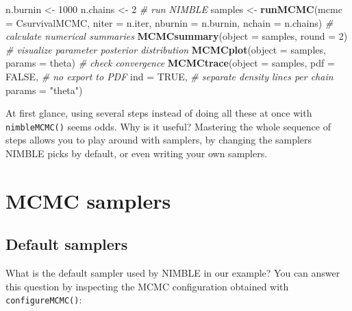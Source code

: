 \documentclass[
  12pt,
]{krantz}
\newenvironment{Shaded}{\begin{snugshade}}{\end{snugshade}}
\newcommand{\AttributeTok}[1]{\textcolor[rgb]{0.13,0.29,0.53}{#1}}
\newcommand{\CommentTok}[1]{\textcolor[rgb]{0.56,0.35,0.01}{\textit{#1}}}
\newcommand{\ConstantTok}[1]{\textcolor[rgb]{0.56,0.35,0.01}{#1}}
\newcommand{\DecValTok}[1]{\textcolor[rgb]{0.00,0.00,0.81}{#1}}
\newcommand{\DocumentationTok}[1]{\textcolor[rgb]{0.56,0.35,0.01}{\textbf{\textit{#1}}}}
\newcommand{\FunctionTok}[1]{\textcolor[rgb]{0.13,0.29,0.53}{\textbf{#1}}}
\newcommand{\NormalTok}[1]{#1}
\newcommand{\OtherTok}[1]{\textcolor[rgb]{0.56,0.35,0.01}{#1}}
\newcommand{\SpecialCharTok}[1]{\textcolor[rgb]{0.81,0.36,0.00}{\textbf{#1}}}
\newcommand{\StringTok}[1]{\textcolor[rgb]{0.31,0.60,0.02}{#1}}
\begin{document}
\begin{blackbox}
\begin{Shaded}
\begin{Highlighting}[]
\NormalTok{n.burnin }\OtherTok{\textless{}{-}} \DecValTok{1000}
\NormalTok{n.chains }\OtherTok{\textless{}{-}} \DecValTok{2}
\CommentTok{\# run NIMBLE}
\NormalTok{samples }\OtherTok{\textless{}{-}} \FunctionTok{runMCMC}\NormalTok{(}\AttributeTok{mcmc =}\NormalTok{ CsurvivalMCMC, }
                   \AttributeTok{niter =}\NormalTok{ n.iter,}
                   \AttributeTok{nburnin =}\NormalTok{ n.burnin,}
                   \AttributeTok{nchain =}\NormalTok{ n.chains)}
\CommentTok{\# calculate numerical summaries}
\FunctionTok{MCMCsummary}\NormalTok{(}\AttributeTok{object =}\NormalTok{ samples, }\AttributeTok{round =} \DecValTok{2}\NormalTok{)}
\CommentTok{\# visualize parameter posterior distribution}
\FunctionTok{MCMCplot}\NormalTok{(}\AttributeTok{object =}\NormalTok{ samples, }
         \AttributeTok{params =} \StringTok{\textquotesingle{}theta\textquotesingle{}}\NormalTok{)}
\CommentTok{\# check convergence}
\FunctionTok{MCMCtrace}\NormalTok{(}\AttributeTok{object =}\NormalTok{ samples,}
          \AttributeTok{pdf =} \ConstantTok{FALSE}\NormalTok{, }\CommentTok{\# no export to PDF}
          \AttributeTok{ind =} \ConstantTok{TRUE}\NormalTok{, }\CommentTok{\# separate density lines per chain}
          \AttributeTok{params =} \StringTok{"theta"}\NormalTok{)}
\end{Highlighting}
\end{Shaded}

\end{blackbox}

At first glance, using several steps instead of doing all these at once with \texttt{nimbleMCMC()} seems odds. Why is it useful? Mastering the whole sequence of steps allows you to play around with samplers, by changing the samplers NIMBLE picks by default, or even writing your own samplers.

\section{MCMC samplers}\label{mcmc-samplers}

\subsection{Default samplers}\label{change-sampler}

What is the default sampler used by NIMBLE in our example? You can answer this question by inspecting the MCMC configuration obtained with \texttt{configureMCMC()}:

\begin{Shaded}
\end{Shaded}
\end{document}
